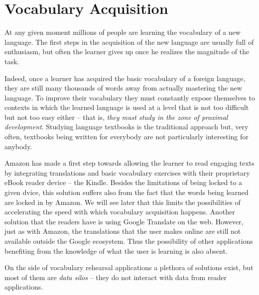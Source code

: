 
\section{Vocabulary Acquisition}


At any given moment millions of people are learning the vocabulary of a new language. The first steps in the acquisition of the new language are usually full of enthusiasm, but often the learner gives up once he realizes the magnitude of the task.

Indeed, once a learner has acquired the basic vocabulary of a foreign language, they are still many thousands of words away from actually mastering the new language. To improve their vocabulary they must constantly expose themselves to contexts in which the learned language is used at a level that is not too difficult but not too easy either -- that is, {\em they must study in the zone of proximal development}. Studying language textbooks is the traditional approach but, very often, textbooks being written for everybody are not particularly interesting for anybody.

Amazon has made a first step towards allowing the learner to read engaging texts by integrating translations and basic vocabulary exercises with their proprietary eBook reader device -- the Kindle. Besides the limitations of being locked to a given dvice, this solution suffers also from the fact that the words being learned are locked in by Amazon. We will see later that this limits the possibilities of accelerating the speed with which vocabulary acquisition happens.
Another solution that the readers have is using Google Translate on the web. However, just as with Amazon, the translations that the user makes online are still not available outside the Google ecosystem. Thus the possibility of other applications benefiting from the knowledge of what the user is learning is also absent.

On the side of vocabulary rehearsal applications a plethora of solutions exist, but most of them are {\em data silos} -- they do not interact with data from reader applications. 

